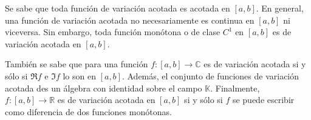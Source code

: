 \documentclass[12pt]{report}
\theoremstyle{largebreak}
\newcommand\cf[3]{\ensuremath{#1:#2\rightarrow#3}}
\begin{document}
    Se sabe que toda función de variación acotada es acotada en $[a,b]$. En general, una función de variación acotada no necesariamente es continua en $[a,b]$ ni viceversa. Sin embargo, toda función monótona o de clase $C^1$ en $[a,b]$ es de variación acotada en $[a,b]$.

    También se sabe que para una función $\cf{f}{[a,b]}{\mathbb{C}}$ es de variación acotada si y sólo si $\Re f$ e $\Im f$ lo son en $[a,b]$. Además, el conjunto de funciones de variación acotada des un álgebra con identidad sobre el campo $\mathbb{K}$. Finalmente, $\cf{f}{[a,b]}{\mathbb{R}}$ es de variación acotada en $[a,b]$ si y sólo si $f$ se puede escribir como diferencia de dos funciones monótonas.
\end{document}
